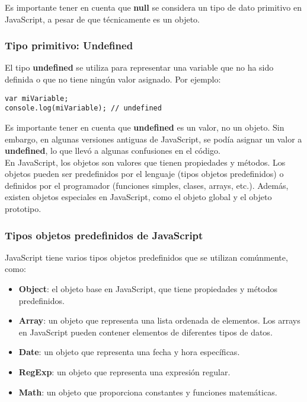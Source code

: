 \documentclass[executivepaper]{article}
\begin{document}
Es importante tener en cuenta que \textbf{null} se considera un tipo de dato primitivo en JavaScript, a pesar de que técnicamente es un objeto.

\subsubsection*{Tipo primitivo: Undefined}

El tipo \textbf{undefined} se utiliza para representar una variable que no ha sido definida o que no tiene ningún valor asignado. Por ejemplo:

\begin{lstlisting}
var miVariable;
console.log(miVariable); // undefined
\end{lstlisting}

Es importante tener en cuenta que \textbf{undefined} es un valor, no un objeto. Sin embargo, en algunas versiones antiguas de JavaScript, se podía asignar un valor a \textbf{undefined}, lo que llevó a algunas confusiones en el código.\\

En JavaScript, los objetos son valores que tienen propiedades y métodos. Los objetos pueden ser predefinidos por el lenguaje (tipos objetos predefinidos) o definidos por el programador (funciones simples, clases, arrays, etc.). Además, existen objetos especiales en JavaScript, como el objeto global y el objeto prototipo.

\subsubsection*{Tipos objetos predefinidos de JavaScript}

JavaScript tiene varios tipos objetos predefinidos que se utilizan comúnmente, como:

\begin{itemize}
\item \textbf{Object}: el objeto base en JavaScript, que tiene propiedades y métodos predefinidos.
\item \textbf{Array}: un objeto que representa una lista ordenada de elementos. Los arrays en JavaScript pueden contener elementos de diferentes tipos de datos.
\item \textbf{Date}: un objeto que representa una fecha y hora específicas.
\item \textbf{RegExp}: un objeto que representa una expresión regular.
\item \textbf{Math}: un objeto que proporciona constantes y funciones matemáticas.
\end{itemize}
\end{document}
